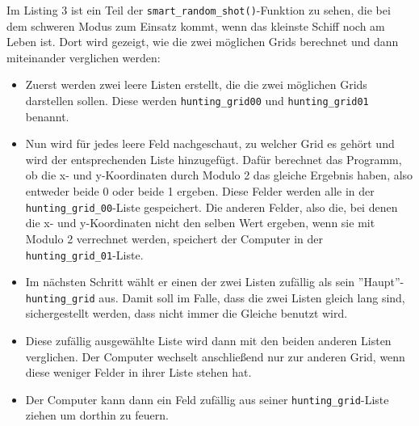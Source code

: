 \documentclass{article}
\begin{document}
\par
    Im Listing 3 ist ein Teil der \verb$smart_random_shot()$-Funktion zu sehen, die bei dem schweren Modus zum Einsatz kommt, wenn das kleinste Schiff noch am Leben ist. Dort wird gezeigt, wie die zwei möglichen Grids berechnet und dann miteinander verglichen werden:
\setlist{}%
\begin{itemize}
\itemsep0em
    \item Zuerst werden zwei leere Listen erstellt, die die zwei möglichen Grids darstellen sollen. Diese werden \verb$hunting_grid00$ und \verb$hunting_grid01$ benannt.

    \item Nun wird für jedes leere Feld nachgeschaut, zu welcher Grid es gehört und wird der entsprechenden Liste hinzugefügt. Dafür berechnet das Programm, ob die x- und y-Koordinaten durch Modulo 2 das gleiche Ergebnis haben, also entweder beide 0 oder beide 1 ergeben. Diese Felder werden alle in der \verb$hunting_grid_00$-Liste gespeichert. Die anderen Felder, also die, bei denen die x- und y-Koordinaten nicht den selben Wert ergeben, wenn sie mit Modulo 2 verrechnet werden, speichert der Computer in der \verb$hunting_grid_01$-Liste.

    \item Im nächsten Schritt wählt er einen der zwei Listen zufällig als sein ''Haupt''-\verb$hunting_grid$ aus. Damit soll im Falle, dass die zwei Listen gleich lang sind, sichergestellt werden, dass nicht immer die Gleiche benutzt wird.

    \item Diese zufällig ausgewählte Liste wird dann mit den beiden anderen Listen verglichen. Der Computer wechselt anschließend nur zur anderen Grid, wenn diese weniger Felder in ihrer Liste stehen hat.

    \item Der Computer kann dann ein Feld zufällig aus seiner \verb$hunting_grid$-Liste ziehen um dorthin zu feuern.
\end{itemize}
\end{document}
